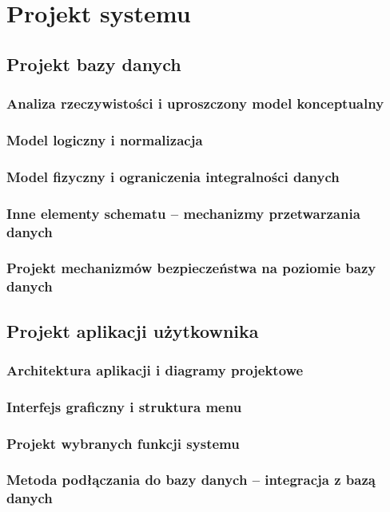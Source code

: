\documentclass[a4paper, 12pt]{article}
\begin{document}
\section{Projekt systemu}
\subsection{Projekt bazy danych}
\subsubsection{Analiza rzeczywistości i uproszczony model konceptualny}
\subsubsection{Model logiczny i normalizacja}
\subsubsection{Model fizyczny i ograniczenia integralności danych}
\subsubsection{Inne elementy schematu – mechanizmy przetwarzania danych}
\subsubsection{Projekt mechanizmów bezpieczeństwa na poziomie bazy danych}

\subsection{Projekt aplikacji użytkownika}
\subsubsection{Architektura aplikacji i diagramy projektowe}
\subsubsection{Interfejs graficzny i struktura menu}
\subsubsection{Projekt wybranych funkcji systemu}
\subsubsection{Metoda podłączania do bazy danych – integracja z bazą danych}
\end{document}
